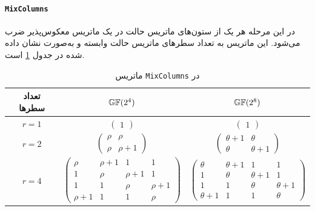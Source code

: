 \paragraph*{\texttt{MixColumns}}
در این مرحله هر یک از ستون‌های ماتریس حالت در یک ماتریس معکوس‌پذیر   ضرب می‌شود. این ماتریس  به تعداد سطرهای ماتریس حالت وابسته و به‌صورت نشان داده شده در جدول 
\ref{tab:sr.MixColumns_Matrix}
است. 
\begin{table}
	\begin{center}
		\begin{tabular}{|c||c|c|}
			\hline 
			تعداد سطرها & $\mathbb{GF}(2^{4})$ & $\mathbb{GF}(2^{8})$ \\ 
			\hline 
			\hline
			$r = 1$ & 
			$
			\begin{pmatrix}
			1
			\end{pmatrix}
			$
			&
			$
			\begin{pmatrix}
			1
			\end{pmatrix}			
			$
			\\ 
			\hline 
			$r = 2$ & 
			$
			\begin{pmatrix}
			\rho & \rho\\
			\rho & \rho + 1
			\end{pmatrix} 
			$&  
			$
			\begin{pmatrix}
		    \theta + 1 & \theta\\
		    \theta & \theta + 1		    
			\end{pmatrix} 
			$\\ 
			\hline 
			$r = 4$ & 
			$
			\begin{pmatrix}
			\rho & \rho + 1 & 1 & 1\\
			1 & \rho & \rho + 1 & 1\\
			1 & 1& \rho & \rho + 1\\
			\rho + 1& 1 & 1 & \rho
			\end{pmatrix}
			$
			 & 
			$
			\begin{pmatrix}
			\theta & \theta + 1 & 1 & 1\\
			1 & \theta & \theta + 1 & 1\\
			1 & 1& \theta & \theta + 1\\
			\theta + 1& 1 & 1 & \theta
			\end{pmatrix}
			$ \\ 
			\hline 
		\end{tabular} 
		\caption{ماتریس 
			\texttt{MixColumns}
			در 
			}
		\label{tab:sr.MixColumns_Matrix}
	\end{center}
\end{table}

